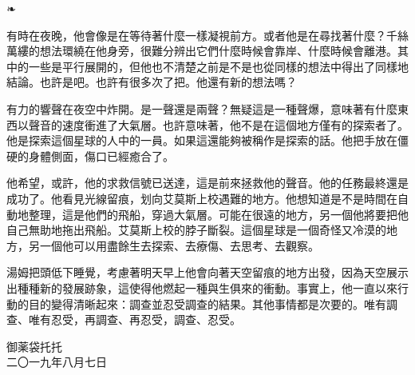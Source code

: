 \documentclass[10pt]{article}
\begin{document}
\begin{center}❧\end{center}

有時在夜晚，他會像是在等待著什麼一樣凝視前方。或者他是在尋找著什麼？千絲萬縷的想法環繞在他身旁，很難分辨出它們什麼時候會靠岸、什麼時候會離港。其中的一些是平行展開的，但他也不清楚之前是不是也從同樣的想法中得出了同樣地結論。也許是吧。也許有很多次了把。他還有新的想法嗎？

有力的響聲在夜空中炸開。是一聲還是兩聲？無疑這是一種聲爆，意味著有什麼東西以聲音的速度衝進了大氣層。也許意味著，他不是在這個地方僅有的探索者了。他是探索這個星球的人中的一員。如果這還能夠被稱作是探索的話。他把手放在僵硬的身體側面，傷口已經癒合了。

他希望，或許，他的求救信號已送達，這是前來拯救他的聲音。他的任務最終還是成功了。他看見光線留痕，划向艾莫斯上校遇難的地方。他想知道是不是時間在自動地整理，這是他們的飛船，穿過大氣層。可能在很遠的地方，另一個他將要把他自己無助地拖出飛船。艾莫斯上校的脖子斷裂。這個星球是一個奇怪又冷漠的地方，另一個他可以用盡餘生去探索、去療傷、去思考、去觀察。

湯姆把頭低下睡覺，考慮著明天早上他會向著天空留痕的地方出發，因為天空展示出種種新的發展跡象，這使得他燃起一種與生俱來的衝動。事實上，他一直以來行動的目的變得清晰起來：調查並忍受調查的結果。其他事情都是次要的。唯有調查、唯有忍受，再調查、再忍受，調查、忍受。

\vspace{3em}
\begin{flushleft}
\small{御薬袋托托\\
二〇一九年八月七日}
\end{flushleft}
\end{document}

